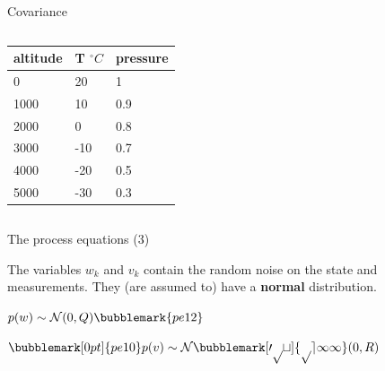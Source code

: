 \documentclass[compress]{beamer}
\begin{document}
\begin{frame}{Covariance}
{    \begin{columns}
        \begin{column}{0.4\linewidth}
            \begin{tabular}{@{}lll@{}}
                \toprule
                altitude & T $^{\circ}C$ & pressure \\ \midrule
                0        & 20          & 1            \\
                1000     & 10          & 0.9          \\
                2000     & 0           & 0.8          \\
                3000     & -10         & 0.7          \\
                4000     & -20         & 0.5          \\
                5000     & -30         & 0.3          \\ \bottomrule
            \end{tabular}

        \end{column}
        \begin{column}{0.6\linewidth}

        \end{column}
    \end{columns}
}
\end{frame}

\begin{frame}{The process equations (3)}

    The variables $w_k$ and $v_k$ contain the random noise on the state and
    measurements. They (are assumed to) have a \textbf{normal} distribution.

    \vspace{3em}

    \Huge\centering
    $p(w) \sim \mathcal{N}(0, Q)\bubblemark{pe12}$

    $\bubblemark[0pt]{pe10}p(v) \sim \mathcal{N\bubblemark[0pt]{pe11}}(0, R)$




\end{frame}
\end{document}
